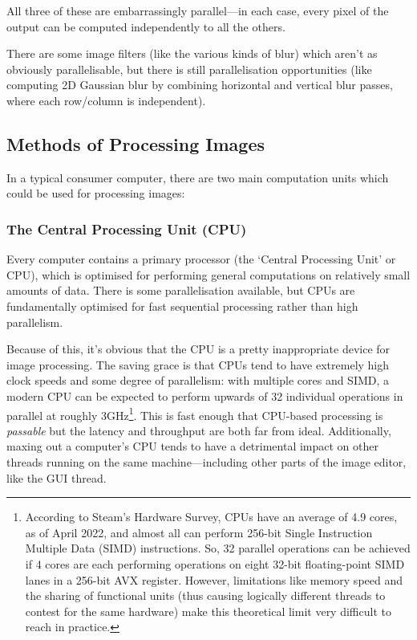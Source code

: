 \documentclass[12pt]{article}
\begin{document}
All three of these are embarrassingly parallel---in each case, every pixel of the output can be
computed independently to all the others.

There are some image filters (like the various kinds of blur) which aren't as obviously
parallelisable, but there is still parallelisation opportunities (like computing 2D Gaussian blur by
combining horizontal and vertical blur passes, where each row/column is independent).



\subsection{Methods of Processing Images}

In a typical consumer computer, there are two main computation units which could be used for
processing images:

\subsubsection{The Central Processing Unit (CPU)}\label{sec:cpu}

Every computer contains a primary processor (the `Central Processing Unit' or CPU), which is
optimised for performing general computations on relatively small amounts of data.  There is some
parallelisation available, but CPUs are fundamentally optimised for fast sequential processing
rather than high parallelism.

Because of this, it's obvious that the CPU is a pretty inappropriate device for image processing.
The saving grace is that CPUs tend to have extremely high clock speeds and some degree of
parallelism: with multiple cores and SIMD, a modern CPU can be expected to perform upwards of 32
individual operations in parallel at roughly 3GHz\footnote{According to Steam's Hardware Survey,
CPUs have an average of 4.9 cores, as of April 2022, and almost all can perform 256-bit Single
Instruction Multiple Data (SIMD) instructions.  So, 32 parallel operations can be achieved if 4
cores are each performing operations on eight 32-bit floating-point SIMD lanes in a 256-bit AVX
register.  However, limitations like memory speed and the sharing of functional units (thus causing
logically different threads to contest for the same hardware) make this theoretical limit very
difficult to reach in practice.}.  This is fast enough that CPU-based processing is \emph{passable}
but the latency and throughput are both far from ideal.  Additionally, maxing out a computer's CPU
tends to have a detrimental impact on other threads running on the same machine---including other
parts of the image editor, like the GUI thread.
\end{document}
